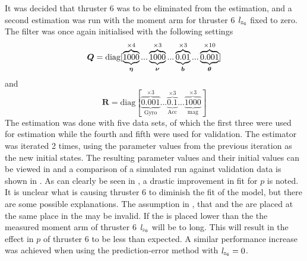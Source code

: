 It was decided that thruster 6 was to be eliminated from the estimation, and a second estimation was run with the moment arm for thruster 6 $\mathit{l}_{z_{6}}$ fixed to zero. The filter was once again initialised with the following settings
\begin{equation*}
\boldsymbol{Q}=\text{diag}[\underbrace{\overbrace{1000}^{\times4}}_{\boldsymbol{\eta}}... \underbrace{\overbrace{1000}^{\times3}}_{\boldsymbol{\nu}}...\underbrace{\overbrace{0.01}^{\times3}}_{\boldsymbol{b}}... \underbrace{\overbrace{0.001}^{\times10}}_{\boldsymbol{\theta}}]
\end{equation*}
and
\begin{equation*}
\boldsymbol{R} = \text{diag}[\underbrace{\overbrace{0.001}^{\times3}}_{\text{Gyro}}... \underbrace{\overbrace{0.1}^{\times3}}_{\text{Acc}}... \underbrace{\overbrace{1000}^{\times3}}_{\text{mag}}]
\end{equation*} 
The estimation was done with five data sets, of which the first three were used for estimation while the fourth and fifth were used for validation. The estimator was iterated 2 times, using the parameter values from the previous iteration as the new initial states. The resulting parameter values and their initial values can be viewed in  and a comparison of a simulated run against validation data is shown in . As can clearly be seen in , a drastic improvement in fit for $p$ is noted. It is unclear what is causing thruster 6 to diminish the fit of the model, but there are some possible explanations. The assumption in , that \abbrCG and the \abbrCO are placed at the same place in the \abbrROV may be invalid. If the \abbrCG is placed lower than the \abbrCO the measured moment arm of thruster 6 $\mathit{l}_{z_{6}}$
 will be to long. This will result in the effect in $p$ of thruster 6 to be less than expected. A similar performance increase was achieved when using the prediction-error method with $\mathit{l}_{z_{6}}=0$.

